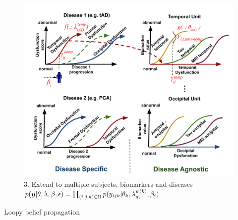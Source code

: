 \documentclass[portrait,a0,final,20pt]{a0poster}
\newcommand{\fnt}[1]{\LARGE{#1}}
\begin{document}
{\begin{multicols}{2}
\begin{figure}[H]
 \includegraphics[width=\columnwidth]{disease_knowledge_transfer_poster.pdf}
  \fnt{3. Extend to multiple subjects, biomarkers and diseases}\\
 $ p(\boldsymbol{y}|\theta, \lambda, \beta , \epsilon) = \prod_{(i,j,k) \in \Omega} p(y_{ijk}|\theta_k, \lambda_{d_i}^{\psi(k)}, \beta_{i}) $
 \end{figure}



 Loopy belief propagation


\newcommand{\uu}{^{(u)}}
\newcommand{\um}{^{(u-1)}}

\newcommand{\algoFnt}[1]{\Large{#1}}



\end{multicols}}
\end{document}
